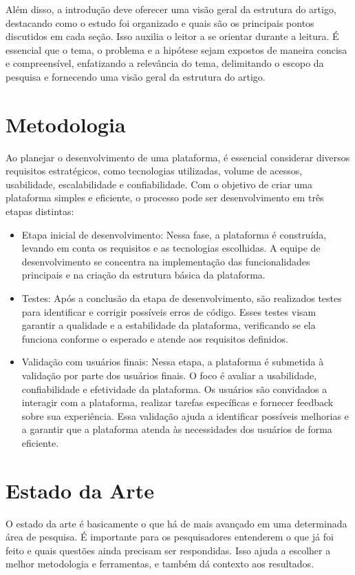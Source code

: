 \documentclass[12pt]{article}
\begin{document}
Além disso, a introdução deve oferecer uma visão geral da estrutura do artigo, destacando como o estudo foi organizado e quais são os principais pontos discutidos em cada seção. Isso auxilia o leitor a se orientar durante a leitura. É essencial que o tema, o problema e a hipótese sejam expostos de maneira concisa e compreensível, enfatizando a relevância do tema, delimitando o escopo da pesquisa e fornecendo uma visão geral da estrutura do artigo.
\section{Metodologia} \label{sec:firstpage}
Ao planejar o desenvolvimento de uma plataforma, é essencial considerar diversos requisitos estratégicos, como tecnologias utilizadas, volume de acessos, usabilidade, escalabilidade e confiabilidade. Com o objetivo de criar uma plataforma simples e eficiente, o processo pode ser desenvolvimento em três etapas distintas:
   \begin{itemize}
       \item Etapa inicial de desenvolvimento: Nessa fase, a plataforma é construída, levando em conta os requisitos e as tecnologias escolhidas. A equipe de desenvolvimento se concentra na implementação das funcionalidades principais e na criação da estrutura básica da plataforma.
       \item Testes: Após a conclusão da etapa de desenvolvimento, são realizados testes para identificar e corrigir possíveis erros de código. Esses testes visam garantir a qualidade e a estabilidade da plataforma, verificando se ela funciona conforme o esperado e atende aos requisitos definidos.
       \item Validação com usuários finais: Nessa etapa, a plataforma é submetida à validação por parte dos usuários finais. O foco é avaliar a usabilidade, confiabilidade e efetividade da plataforma. Os usuários são convidados a interagir com a plataforma, realizar tarefas específicas e fornecer feedback sobre sua experiência. Essa validação ajuda a identificar possíveis melhorias e a garantir que a plataforma atenda às necessidades dos usuários de forma eficiente.
   \end{itemize}

\section{Estado da Arte}
O estado da arte é basicamente o que há de mais avançado em uma determinada área de pesquisa. É importante para os pesquisadores entenderem o que já foi feito e quais questões ainda precisam ser respondidas. Isso ajuda a escolher a melhor metodologia e ferramentas, e também dá contexto aos resultados.
\end{document}
